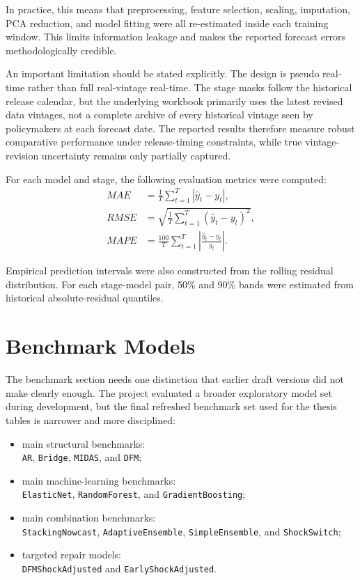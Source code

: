 \documentclass[12pt,a4paper]{article}
\begin{document}
In practice, this means that preprocessing, feature selection, scaling, imputation, PCA reduction, and model fitting were all re-estimated inside each training window. This limits information leakage and makes the reported forecast errors methodologically credible.

An important limitation should be stated explicitly. The design is pseudo real-time rather than full real-vintage real-time. The stage masks follow the historical release calendar, but the underlying workbook primarily uses the latest revised data vintages, not a complete archive of every historical vintage seen by policymakers at each forecast date. The reported results therefore measure robust comparative performance under release-timing constraints, while true vintage-revision uncertainty remains only partially captured.

For each model and stage, the following evaluation metrics were computed:
\begin{align}
    MAE &= \frac{1}{T}\sum_{t=1}^T |\hat{y}_t - y_t|, \\
    RMSE &= \sqrt{\frac{1}{T}\sum_{t=1}^T (\hat{y}_t - y_t)^2}, \\
    MAPE &= \frac{100}{T}\sum_{t=1}^T \left| \frac{\hat{y}_t - y_t}{y_t} \right|.
\end{align}

Empirical prediction intervals were also constructed from the rolling residual distribution. For each stage-model pair, 50\% and 90\% bands were estimated from historical absolute-residual quantiles.

\section{Benchmark Models}

The benchmark section needs one distinction that earlier draft versions did not make clearly enough. The project evaluated a broader exploratory model set during development, but the final refreshed benchmark set used for the thesis tables is narrower and more disciplined:
\begin{itemize}
    \item main structural benchmarks:\\ \texttt{AR}, \texttt{Bridge}, \texttt{MIDAS}, and \texttt{DFM};
    \item main machine-learning benchmarks:\\ \texttt{ElasticNet}, \texttt{RandomForest}, and \texttt{GradientBoosting};
    \item main combination benchmarks:\\ \texttt{StackingNowcast}, \texttt{AdaptiveEnsemble}, \texttt{SimpleEnsemble}, and \texttt{ShockSwitch};
    \item targeted repair models:\\ \texttt{DFMShockAdjusted} and \texttt{EarlyShockAdjusted}.
\end{itemize}
\end{document}
